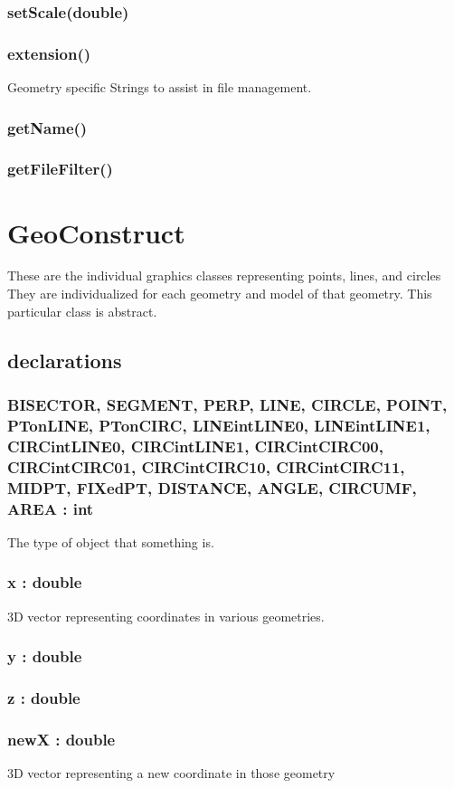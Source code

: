 \documentclass[a4paper,10pt]{report}
\begin{document}
\subsubsection{setScale(double)}
\subsubsection{extension()} Geometry specific Strings to assist in file management.
\subsubsection{getName()} 
\subsubsection{getFileFilter()}
\section{GeoConstruct}
  These are the individual graphics classes representing points, lines, and circles
  They are individualized for each geometry and model of that geometry.  This particular class is abstract.
 
 \subsection{declarations}
\subsubsection{BISECTOR,
SEGMENT, 
PERP, 
LINE, 
CIRCLE, 
POINT, 
PTonLINE, 
PTonCIRC, 
LINEintLINE0, 
LINEintLINE1, 
CIRCintLINE0, 
CIRCintLINE1, 
CIRCintCIRC00, 
CIRCintCIRC01, 
CIRCintCIRC10, 
CIRCintCIRC11, 
MIDPT, 
FIXedPT, 
DISTANCE, 
ANGLE, 
CIRCUMF, 
AREA : int}  The type of object that something is.  
\subsubsection{x : double} 3D vector representing coordinates in various geometries.
\subsubsection{y : double}
\subsubsection{z : double}
\subsubsection{newX : double} 3D vector representing a new coordinate in those geometry
\end{document}
